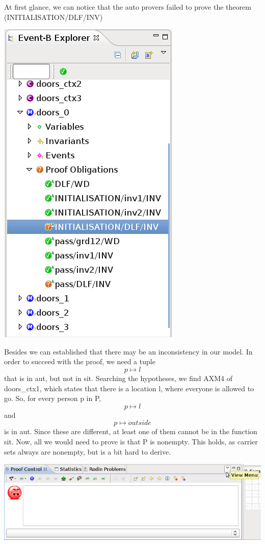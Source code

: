 At first glance, we can notice that the auto provers failed to prove the theorem (\textsf{INITIALISATION/DLF/INV})
\begin{center}
	\includegraphics[]{img/tutorial/tut_10_proversfailed.png}
\end{center}

Besides we can established that there may be an inconsistency in our model.
In order to succeed with the proof, we need a tuple \[ p \mapsto l \]that is in aut, but not in sit. Searching the hypotheses, we find AXM4 of doors\_ctx1, which states that there is a location l, where everyone is allowed to go. So, for every person p in P, \[p \mapsto l \] and \[p \mapsto outside\] is in aut. Since these are different, at least one of them cannot be in the function sit. Now, all we would need to prove is that P is nonempty. This holds, as carrier sets always are nonempty, but is a bit hard to derive.

\begin{center}
	\includegraphics[]{img/tutorial/tut_10_view_menu.png}
\end{center}

